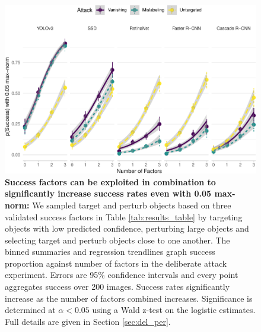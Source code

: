 \begin{figure}[tb]

{\centering \includegraphics[width=1\linewidth]{imgs/biased_trend_graph_normed} 

}

\caption{\textbf{Success factors can be exploited in combination to significantly increase success rates even with 0.05 max-norm:}  We sampled target and perturb objects based on three validated success factors in Table \ref{tab:results_table} by targeting objects with low predicted confidence, perturbing large objects and selecting target and perturb objects close to one another. The binned summaries and regression trendlines graph success proportion against number of factors in the deliberate attack experiment. Errors are 95\% confidence intervals and every point aggregates success over 200 images. Success rates significantly increase as the number of factors combined increases. Significance is determined at $\alpha < 0.05$ using a Wald z-test on the logistic estimates. Full details are given in Section \ref{sec:del_per}.}\label{fig:biased_trend_graph_normed}
\end{figure}
